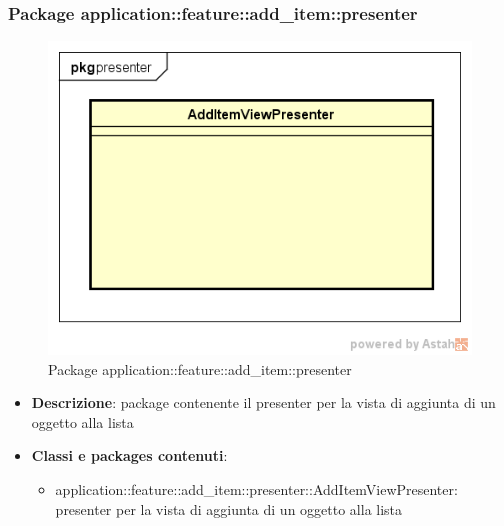 \subsubsection{Package application::feature::add\_item::presenter}
\label{Package application::feature::add_item::presenter}
\begin{figure}[H]
	\centering
	\includegraphics[scale=0.5]{Sezioni/Packages/Application/add_item_presenter.png}
	\caption{Package application::feature::add\_item::presenter}
\end{figure}
\begin{itemize}
	\item \textbf{Descrizione}: package contenente il presenter per la vista di aggiunta di un oggetto alla lista
	\item \textbf{Classi e packages contenuti}:
	\begin{itemize}
	\item application::feature::add\_item::presenter::AddItemViewPresenter: presenter per la vista di aggiunta di un oggetto alla lista
	\end{itemize}
\end{itemize}

